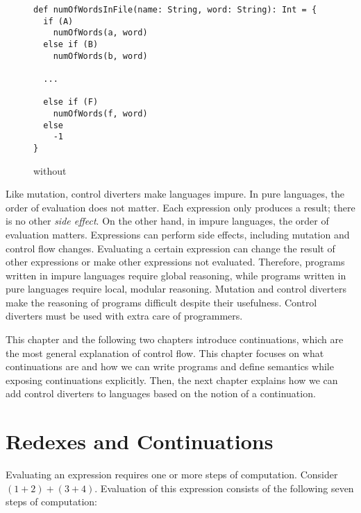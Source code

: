 \begin{figure}[t]
\begin{verbatim}
def numOfWordsInFile(name: String, word: String): Int = {
  if (A)
    numOfWords(a, word)
  else if (B)
    numOfWords(b, word)

  ...

  else if (F)
    numOfWords(f, word)
  else
    -1
}
\end{verbatim}
\caption{ without }
\end{figure}

Like mutation, control diverters make languages impure. In pure languages, the
order of evaluation does not matter. Each expression only produces a result;
there is no other \textit{side effect}.
On the other hand, in impure languages, the order
of evaluation matters. Expressions can perform side effects, including mutation
and control flow changes. Evaluating a certain expression can change the result
of other expressions or make other expressions not evaluated. Therefore,
programs written in impure languages require global reasoning, while programs
written in pure languages require local, modular reasoning.
Mutation and control diverters make the reasoning of programs difficult despite
their usefulness. Control diverters must be used with extra care of programmers.

This chapter and the following two chapters introduce continuations, which are
the most general explanation of control flow. This chapter focuses on what
continuations are and how we can write programs and define semantics while
exposing continuations explicitly. Then, the next chapter explains how we can
add control diverters to languages based on the notion of a continuation.

\section{Redexes and Continuations}

Evaluating an expression requires one or more steps of computation.
Consider $(1+2)+(3+4)$. Evaluation of this expression consists of the following
seven steps of computation:

